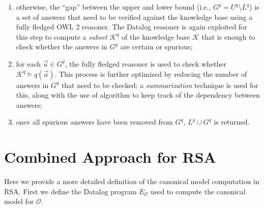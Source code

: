 \documentclass[runningheads]{llncs}
\newcommand{\datalog}{\mbox{Datalog}\xspace}
\begin{document}
\begin{enumerate}
        if lower and upper bound coincide (i.e.\ $L^q = U^q$) then the \datalog reasoner was able to provide a sound and complete set of answers to the input query.
        The computation terminates;
    \item
        otherwise, the ``gap'' between the upper and lower bound (i.e., $G^q = U^q \setminus L^q$) is a set of answers that need to be verified against the knowledge base using a fully fledged OWL 2 reasoner.
        The \datalog reasoner is again exploited for this step to compute a \emph{subset} $\mathcal{K}^q$ of the knowledge base $\mathcal{K}$ that is enough to check whether the answers in $G^q$ are certain or spurious;
    \item
        for each $\vec{a} \in G^q$, the fully fledged reasoner is used to check whether $\mathcal{K}^q \models q(\vec{a})$.
        This process is further optimized by reducing the number of answers in $G^q$ that need to be checked;
        a \emph{summarization} technique\cite{dolby2007} is used for this, along with the use of algorithm to keep track of the dependency between answers;
    \item
        once all spurious answers have been removed from $G^q$, $L^q \cup G^q$ is returned.
\end{enumerate}

\section{Combined Approach for RSA}\label{apx:combined_approach_for_rsa}
 
Here we provide a more detailed definition of the canonical model computation in RSA.
First we define the \datalog program $E_\mathcal{O}$ used to compute the canonical model for $\mathcal{O}$.
\end{document}
